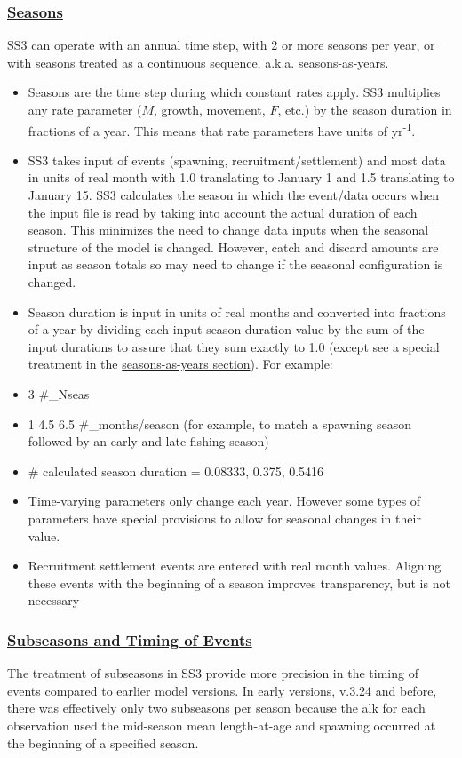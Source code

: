\hypertarget{Seasons}{}
\subsubsection[Seasons]{\protect\hyperlink{Seasons}{Seasons}}
SS3 can operate with an annual time step, with 2 or more seasons per year, or with seasons treated as a continuous sequence, a.k.a. seasons-as-years.
	 \begin{itemize}
	 	\item Seasons are the time step during which constant rates apply. SS3 multiplies any rate parameter ($M$, growth, movement, $F$, etc.) by the season duration in fractions of a year. This means that rate parameters have units of yr\textsuperscript{-1}.
	 	\item SS3 takes input of events (spawning, recruitment/settlement) and most data in units of real month with 1.0 translating to January 1 and 1.5 translating to January 15. SS3 calculates the season in which the event/data occurs when the input file is read by taking into account the actual duration of each season. This minimizes the need to change data inputs when the seasonal structure of the model is changed. However, catch and discard amounts are input as season totals so may need to change if the seasonal configuration is changed.
	 	\item Season duration is input in units of real months and converted into fractions of a year by dividing each input season duration value by the sum of the input durations to assure that they sum exactly to 1.0 (except see a special treatment in the \hyperlink{continuous-seasonal-recruitment-sec}{seasons-as-years section}). For example:
			\item 3 #\_Nseas
			\item 1 4.5 6.5 #\_months/season (for example, to match a spawning season followed by an early and late fishing season)
			\item # calculated season duration = 0.08333, 0.375, 0.5416
	 	\item Time-varying parameters only change each year. However some types of parameters have special provisions to allow for seasonal changes in their value.
	 	\item Recruitment settlement events are entered with real month values. Aligning these events with the beginning of a season improves transparency, but is not necessary 
	 \end{itemize}

\hypertarget{SubSeas}{}
\subsubsection[Subseasons and Timing of Events]{\protect\hyperlink{SubSeas}{Subseasons and Timing of Events}}
The treatment of subseasons in SS3 provide more precision in the timing of events compared to earlier model versions. In early versions, v.3.24 and before, there was effectively only two subseasons per season because the \gls{alk} for each observation used the mid-season mean length-at-age and spawning occurred at the beginning of a specified season.  

